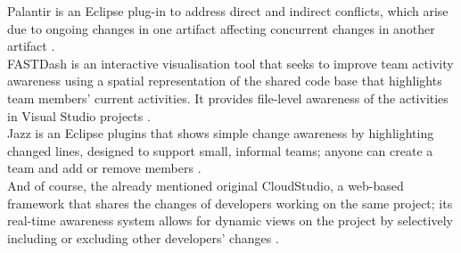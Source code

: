 Palantir is an Eclipse plug-in to address direct and indirect conflicts, which arise due to ongoing changes in one artifact affecting concurrent changes in another artifact \cite{ref22}. \\

FASTDash is an interactive visualisation tool that seeks to improve team activity awareness using a spatial representation of the shared code base that highlights team members' current activities. It provides file-level awareness of the activities in Visual Studio projects \cite{ref26}. \\

Jazz is an Eclipse plugins that shows simple change awareness by highlighting changed lines, designed to support small, informal teams; anyone can create a team and add or remove members \cite{ref27}. \\

And of course, the already mentioned original CloudStudio, a web-based framework that shares the changes of developers working on the same project; its real-time awareness system allows for dynamic views on the project by selectively including or excluding other developers' changes \cite{ref12}.



